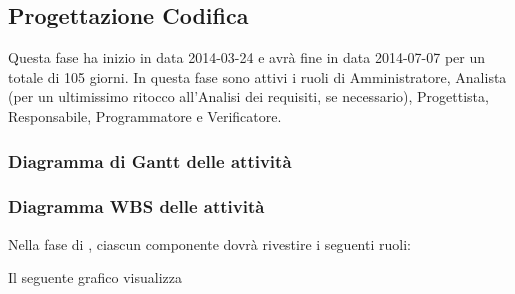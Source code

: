 \subsection{Progettazione Codifica}
Questa fase ha inizio in data 2014-03-24 e avrà fine in data 2014-07-07 per un totale di 105 giorni. In questa fase sono attivi i ruoli di Amministratore, Analista (per un ultimissimo ritocco all'Analisi dei requisiti, se necessario), Progettista, Responsabile, Programmatore e Verificatore.

\subsubsection{Diagramma di Gantt delle attività}


\subsubsection{Diagramma WBS delle attività}




Nella fase di , ciascun componente dovrà rivestire i seguenti ruoli:

Il seguente grafico visualizza 
